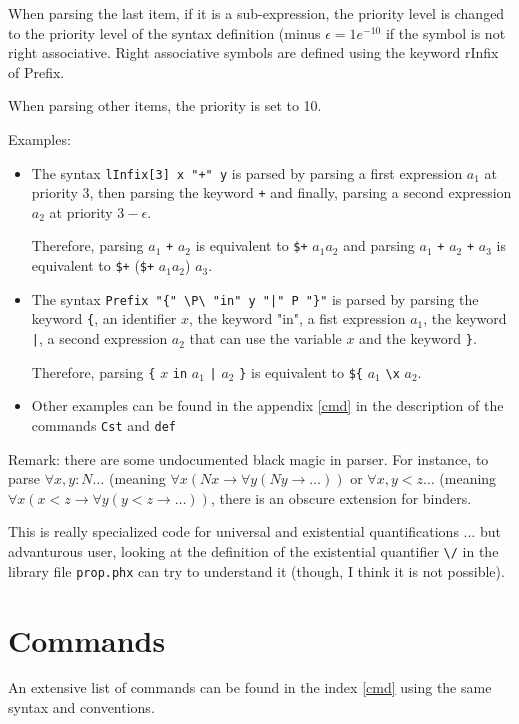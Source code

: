 \begin{enumerate}
\begin{itemize}
When parsing the last item, if it is a sub-expression, the
priority level is changed to the priority level of the syntax
definition (minus $\epsilon = 1e^{-10}$ if the symbol is not right
associative. Right associative symbols are defined using the keyword
rInfix of Prefix.

When parsing other items, the priority is set to 10.

\end{itemize}
\end{enumerate}

Examples:
\begin{itemize}
\item The syntax \verb#lInfix[3] x "+" y# is parsed by parsing
a first expression $a_1$ at priority $3$, then parsing the keyword
\verb#+# and finally, parsing a second expression $a_2$ at priority
$3 - \epsilon$.

Therefore, parsing $a_1$ \verb#+# $a_2$ is equivalent to
\verb#$+# $a_1 a_2$ and parsing $a_1$ \verb#+# $a_2$ \verb#+# $a_3$
is equivalent to
\verb#$+# (\verb#$+# $a_1 a_2$) $a_3$.

\item The syntax \verb#Prefix "{" \P\ "in" y "|" P "}"# is parsed by
parsing the keyword \verb#{#, an identifier $x$, the keyword "in", a
fist expression $a_1$, the keyword \verb#|#, a second expression $a_2$
that can use the variable $x$ and the   keyword \verb#}#.

Therefore, parsing \verb#{# $x$ \verb#in# $a_1$ \verb#|# $a_2$
\verb#}# is equivalent to \verb#${# $a_1$ \verb#\x# $a_2$.

\item Other examples can be found in the appendix \ref{cmd} in the
description of the commands \verb#Cst# and \verb#def#

\end{itemize}

Remark: there are some undocumented black magic in \AFD parser. For
instance, to parse $\forall x,y:N \dots$ (meaning
$\forall x (N x \rightarrow \forall y (N y \rightarrow \dots))$ or
$\forall x,y < z \dots$ (meaning
$\forall x (x < z \rightarrow \forall y (y < z \rightarrow \dots))$,
there is an obscure extension for binders.

This is really specialized code for universal and existential
quantifications ... but advanturous user, looking at the definition of
the existential quantifier \verb#\/# in the library file
\verb#prop.phx# can try to understand it (though, I think it is not
possible).

\section{Commands}

An extensive list of commands can be found in the index \ref{cmd}
using the same syntax and conventions.




